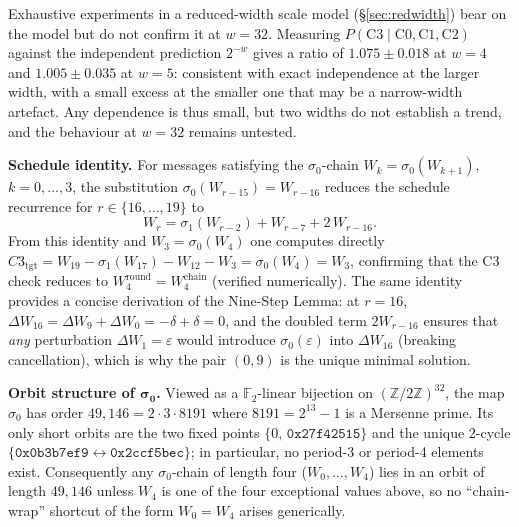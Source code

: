 \documentclass[11pt,a4paper]{article}
\newcommand{\sig}[1]{\sigma_{#1}}
\begin{document}
Exhaustive experiments in a reduced-width scale model (\S\ref{sec:redwidth})
bear on the model but do not confirm it at $w=32$.  Measuring
$P(\text{C3}\mid \text{C0},\text{C1},\text{C2})$ against the independent
prediction $2^{-w}$ gives a ratio of $1.075\pm0.018$ at $w=4$ and
$1.005\pm0.035$ at $w=5$: consistent with exact independence at the larger
width, with a small excess at the smaller one that may be a narrow-width
artefact.  Any dependence is thus small, but two widths do not establish a
trend, and the behaviour at $w=32$ remains untested.

\textbf{Schedule identity.}
For messages satisfying the $\sigma_0$-chain $W_k = \sig{0}(W_{k+1})$, $k=0,\ldots,3$,
the substitution $\sig{0}(W_{r-15}) = W_{r-16}$ reduces the schedule recurrence for $r\in\{16,\ldots,19\}$ to
\[
  W_r = \sig{1}(W_{r-2}) + W_{r-7} + 2\,W_{r-16}.
\]
From this identity and $W_3 = \sig{0}(W_4)$ one computes directly
$C3_{\mathrm{tgt}} = W_{19} - \sig{1}(W_{17}) - W_{12} - W_3 = \sig{0}(W_4) = W_3$,
confirming that the C3 check reduces to $W_4^{\mathrm{round}} = W_4^{\mathrm{chain}}$ (verified numerically).
The same identity provides a concise derivation of the Nine-Step Lemma: at $r=16$,
$\Delta W_{16} = \Delta W_{9} + \Delta W_0 = -\delta + \delta = 0$, and the doubled term
$2W_{r-16}$ ensures that \emph{any} perturbation $\Delta W_1 = \varepsilon$ would
introduce $\sig{0}(\varepsilon)$ into $\Delta W_{16}$ (breaking cancellation), which is
why the pair $(0,9)$ is the unique minimal solution.

\textbf{Orbit structure of $\boldsymbol{\sigma_0}$.}
Viewed as a $\mathbb{F}_2$-linear bijection on $(\mathbb{Z}/2\mathbb{Z})^{32}$, the map $\sigma_0$
has order $49{,}146 = 2\cdot 3\cdot 8191$ where $8191 = 2^{13}-1$ is a Mersenne prime.
Its only short orbits are the two fixed points $\{0,\,\texttt{0x27f42515}\}$
and the unique $2$-cycle $\{\texttt{0x0b3b7ef9} \leftrightarrow \texttt{0x2ccf5bec}\}$;
in particular, no period-3 or period-4 elements exist.
Consequently any $\sigma_0$-chain of length four ($W_0,\ldots,W_4$) lies in an orbit of
length $49{,}146$ unless $W_4$ is one of the four exceptional values above, so
no ``chain-wrap'' shortcut of the form $W_0 = W_4$ arises generically.
\end{document}
